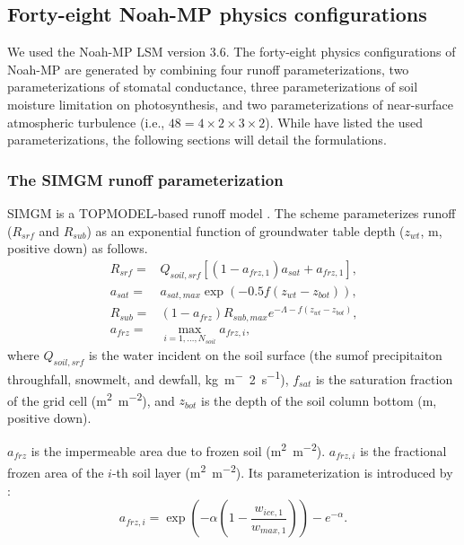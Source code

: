 \documentclass[essd]{copernicus}
\begin{document}
\subsection{Forty-eight Noah-MP physics configurations} \label{sec:data:noahmp}

We used the Noah-MP LSM version 3.6. The forty-eight physics configurations of
Noah-MP are generated by combining four runoff parameterizations, two
parameterizations of stomatal conductance, three parameterizations of soil
moisture limitation on photosynthesis, and two parameterizations of near-surface
atmospheric turbulence (i.e., \(48 = 4 \times 2 \times 3 \times 2\)). While
\citet[Table 1]{zheng2019WRR} have listed the used parameterizations, the
following sections will detail the formulations.

\subsubsection{The SIMGM runoff parameterization}

SIMGM is a TOPMODEL-based runoff model \citep{niu2007JGRA}. The scheme
parameterizes runoff (\(R_{srf}\) and \(R_{sub}\)) as an exponential function of
groundwater table depth (\(z_{wt}\), m, positive down) as follows.
\begin{align}
  R_{srf} = & Q_{soil,srf} [(1 - a_{frz,1}) a_{sat} + a_{frz,1} ]
  \text{,} \label{eq:SIMGM:rsrf} \\
  a_{sat} = & a_{sat,max} \exp(-0.5 f (z_{wt} - z_{bot}))
  \text{,} \label{eq:SIMGM:fsat} \\
  R_{sub} = & (1 - a_{frz}) R_{sub,max} e^{-\Lambda - f(z_{wt} - z_{bot})}
  \text{,} \label{eq:SIMGM:rsub} \\
  a_{frz} = & \max_{i=1,\dots,N_{soil}} a_{frz,i}
  \text{,} \label{eq:SIMGM:ffrzmax}
\end{align}
where \(Q_{soil,srf}\) is the water incident on the soil surface (the sumof
precipitaiton throughfall, snowmelt, and dewfall, \si{kg~m^-2~s^{-1}}),
\(f_{sat}\) is the saturation fraction of the grid cell (\si{m^2~m^{-2}}), and
\(z_{bot}\) is the depth of the soil column bottom (\si{m}, positive down).

\(a_{frz}\) is the impermeable area due to frozen soil (\si{m^2~m^{-2}}).
\(a_{frz,i}\) is the fractional frozen area of the \(i\)-th soil layer
(\si{m^2~m^{-2}}). Its parameterization is introduced by \citet{niu2006JH}:
\begin{equation}
  a_{frz,i} = \exp\left(-\alpha(1 - \frac{w_{ice,1}}{w_{max,1}})\right) -
  e^{-\alpha} \text{.}
\end{equation}
\end{document}
